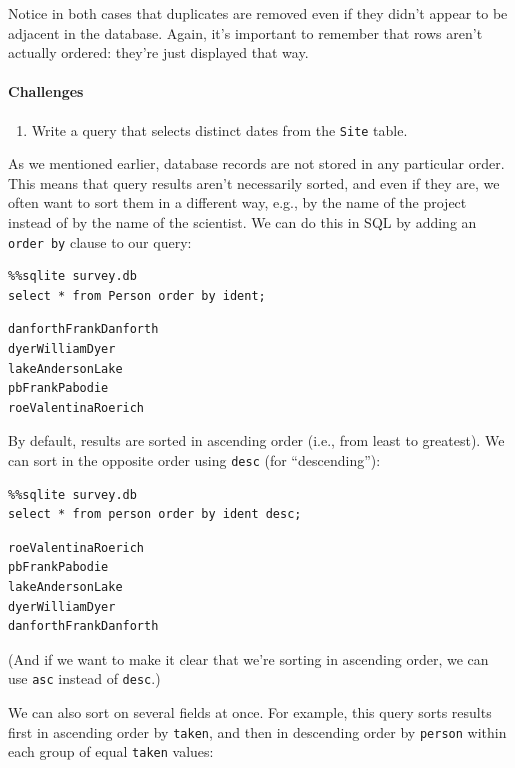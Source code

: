 \documentclass[]{book}
\begin{document}
Notice in both cases that duplicates are removed even if they didn't
appear to be adjacent in the database. Again, it's important to remember
that rows aren't actually ordered: they're just displayed that way.

\mbox{}\paragraph{Challenges}

\begin{enumerate}
\item
  Write a query that selects distinct dates from the \texttt{Site}
  table.
\end{enumerate}

As we mentioned earlier, database records are not stored in any
particular order. This means that query results aren't necessarily
sorted, and even if they are, we often want to sort them in a different
way, e.g., by the name of the project instead of by the name of the
scientist. We can do this in SQL by adding an \texttt{order by} clause
to our query:

\begin{verbatim}
%%sqlite survey.db
select * from Person order by ident;
\end{verbatim}

\begin{verbatim}
danforthFrankDanforth
dyerWilliamDyer
lakeAndersonLake
pbFrankPabodie
roeValentinaRoerich
\end{verbatim}

By default, results are sorted in ascending order (i.e., from least to
greatest). We can sort in the opposite order using \texttt{desc} (for
``descending''):

\begin{verbatim}
%%sqlite survey.db
select * from person order by ident desc;
\end{verbatim}

\begin{verbatim}
roeValentinaRoerich
pbFrankPabodie
lakeAndersonLake
dyerWilliamDyer
danforthFrankDanforth
\end{verbatim}

(And if we want to make it clear that we're sorting in ascending order,
we can use \texttt{asc} instead of \texttt{desc}.)

We can also sort on several fields at once. For example, this query
sorts results first in ascending order by \texttt{taken}, and then in
descending order by \texttt{person} within each group of equal
\texttt{taken} values:
\end{document}

